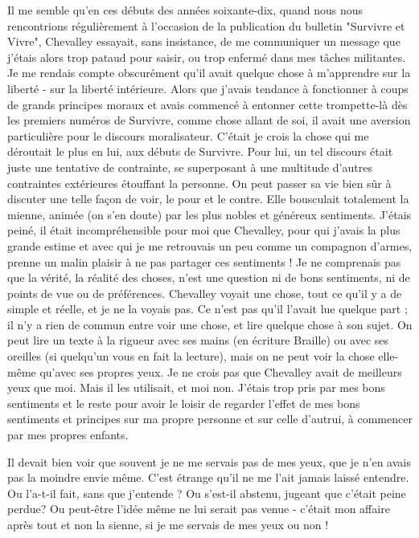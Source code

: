 Il me semble qu'en ces débuts des années soixante-dix, quand nous nous rencontrions régulièrement à l'occasion de la publication du bulletin "Survivre et Vivre", Chevalley essayait, sans insistance, de me communiquer un message que j'étais alors trop pataud pour saisir, ou trop enfermé dans mes tâches militantes. Je me rendais compte obscurément qu'il avait quelque chose à m'apprendre sur la liberté - sur la liberté intérieure. Alors que j'avais tendance à fonctionner à coups de grands principes moraux et avais commencé à entonner cette trompette-là dès les premiers numéros de Survivre, comme chose allant de soi, il avait une aversion particulière pour le discours moralisateur. C'était je crois la chose qui me déroutait le plus en lui, aux débuts de Survivre. Pour lui, un tel discours était juste une tentative de contrainte, se superposant à une multitude d'autres contraintes extérieures étouffant la personne. On peut passer sa vie bien sûr à discuter une telle façon de voir, le pour et le contre. Elle bousculait totalement la mienne, animée (on s'en doute) par les plus nobles et généreux sentiments. J'étais peiné, il était incompréhensible pour moi que Chevalley, pour qui j'avais la plus grande estime et avec qui je me retrouvais un peu comme un compagnon d'armes, prenne un malin plaisir à ne pas partager ces sentiments ! Je ne comprenais pas que la vérité, la réalité des choses, n'est une question ni de bons sentiments, ni de points de vue ou de préférences. Chevalley voyait une chose, tout ce qu'il y a de simple et réelle, et je ne la voyais pas. Ce n'est pas qu'il l'avait lue quelque part ; il n'y a rien de commun entre voir une chose, et lire quelque chose à son sujet. On peut lire un texte à la rigueur avec ses mains (en écriture Braille) ou avec ses oreilles (si quelqu'un vous en fait la lecture), mais on ne peut voir la chose elle-même qu'avec ses propres yeux. Je ne crois pas que Chevalley avait de meilleurs yeux que moi. Mais il les utilisait, et moi non. J'étais trop pris par mes bons sentiments et le reste pour avoir le loisir de regarder l'effet de mes bons sentiments et principes sur ma propre personne et sur celle d'autrui, à commencer par mes propres enfants.

Il devait bien voir que souvent je ne me servais pas de mes yeux, que je n'en avais pas la moindre envie même. C'est étrange qu'il ne me l'ait jamais laissé entendre. Ou l'a-t-il fait, sans que j'entende ? Ou s'est-il abstenu, jugeant que c'était peine perdue? Ou peut-être l'idée même ne lui serait pas venue - c'était mon affaire après tout et non la sienne, si je me servais de mes yeux ou non !

